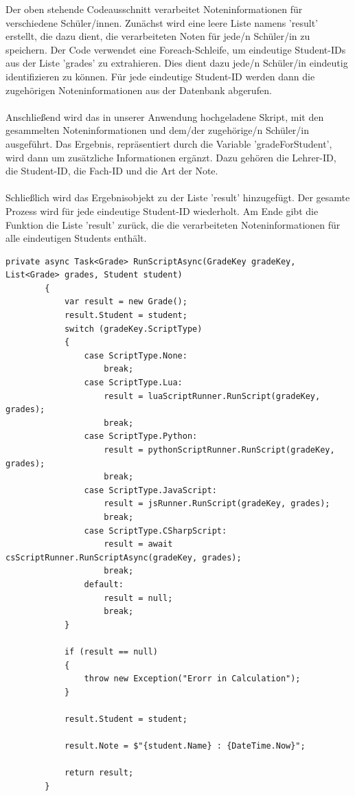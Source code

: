 Der oben stehende Codeausschnitt verarbeitet Noteninformationen für verschiedene Schüler/innen. 
Zunächst wird eine leere Liste namens 'result' erstellt, die dazu dient, die verarbeiteten Noten für 
jede/n Schüler/in zu speichern. Der Code verwendet eine Foreach-Schleife, um eindeutige Student-IDs aus 
der Liste 'grades' zu extrahieren. Dies dient dazu jede/n Schüler/in eindeutig identifizieren zu können.
Für jede eindeutige Student-ID werden dann die zugehörigen Noteninformationen aus der Datenbank abgerufen.
\\\\
Anschließend wird das in unserer Anwendung hochgeladene Skript, mit den gesammelten Noteninformationen 
und dem/der zugehörige/n Schüler/in ausgeführt. Das Ergebnis, repräsentiert durch die Variable 'gradeForStudent', 
wird dann um zusätzliche Informationen ergänzt. Dazu gehören die Lehrer-ID, die Student-ID, 
die Fach-ID und die Art der Note.
\\\\
Schließlich wird das Ergebnisobjekt zu der Liste 'result' hinzugefügt. Der gesamte Prozess wird für 
jede eindeutige Student-ID wiederholt. Am Ende gibt die Funktion die Liste 'result' zurück, die die 
verarbeiteten Noteninformationen für alle eindeutigen Students enthält.

        
\newpage
\begin{lstlisting}[language={[Sharp]C}, caption=Code for handing the Script-Type, label=lst:imp:calc]               
        private async Task<Grade> RunScriptAsync(GradeKey gradeKey, List<Grade> grades, Student student)
        {
            var result = new Grade();
            result.Student = student;
            switch (gradeKey.ScriptType)
            {
                case ScriptType.None:
                    break;
                case ScriptType.Lua:
                    result = luaScriptRunner.RunScript(gradeKey, grades);
                    break;
                case ScriptType.Python:
                    result = pythonScriptRunner.RunScript(gradeKey, grades);
                    break;
                case ScriptType.JavaScript:
                    result = jsRunner.RunScript(gradeKey, grades);
                    break;
                case ScriptType.CSharpScript:
                    result = await csScriptRunner.RunScriptAsync(gradeKey, grades);
                    break;
                default:
                    result = null;
                    break;
            }

            if (result == null)
            {
                throw new Exception("Erorr in Calculation");
            }

            result.Student = student;

            result.Note = $"{student.Name} : {DateTime.Now}";

            return result;
        }
\end{lstlisting}

